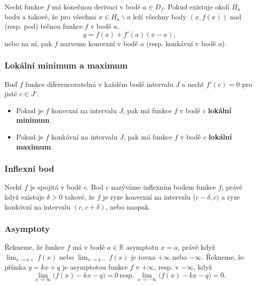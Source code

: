 \documentclass{szzclass}
\begin{document}
Nechť funkce $f$ má konečnou derivaci v bodě $a\in D_f$.
Pokud existuje okolí $H_a$ bodu a takové, že pro všechna
$x\in H_a \backslash {a}$ leží všechny body $(x,f(x))$
nad (resp. pod) tečnou funkce $f$ v bodě $a$,
\begin{equation*}
y = f(a) + f'(a) (x-a),\end{equation*}
nebo na ní, pak $f$ nazveme konvexní v bodě $a$ (resp. konkávní v bodě $a$).


\subsubsection{Lokální minimum a maximum}
Buď $f$ funkce diferencovatelná v každém bodě intervalu $J$ a nechť $f'(c)=0$ pro jisté $c\in J^\circ$.
\begin{itemize}
    \item Pokud je $f$ konvexní na intervalu $J$, pak má funkce $f$ v bodě $c$ \textbf{lokální minimum}.
    \item Pokud je $f$ konkávní na intervalu $J$, pak má funkce $f$ v bodě $c$ \textbf{lokální maximum}.
\end{itemize}

\subsubsection{Inflexní bod}
Nechť $f$ je spojitá v bodě $c$. Bod $c$ nazýváme inflexním bodem funkce $f$,
právě když existuje $\delta>0$ takové, že $f$ je ryze konvexní na intervalu
($c-\delta,c)$ a ryze konkávní na intervalu $(c,c+\delta)$, nebo naopak.

\subsubsection{Asymptoty}
Řekneme, že funkce $f$ má v bodě $a \in \mathbb{R}$ asymptotu $x=a$,
právě když $\displaystyle\lim_{x\to a+} f(x)$ nebo
$\displaystyle\lim_{x\to a-} f(x)$ je rovna $+\infty$ nebo $-\infty$.
Řekneme, že přímka $y=kx+q$ je asymptotou funkce $f$ v $+\infty$,
resp. v $-\infty$, když
\begin{equation*}
\lim_{x\to\infty} \big( f(x) - kx - q \big) = 0 \ \text{resp.} \ \lim_{x\to-\infty} \big( f(x) - kx-q \big) = 0.\end{equation*}
\end{document}
